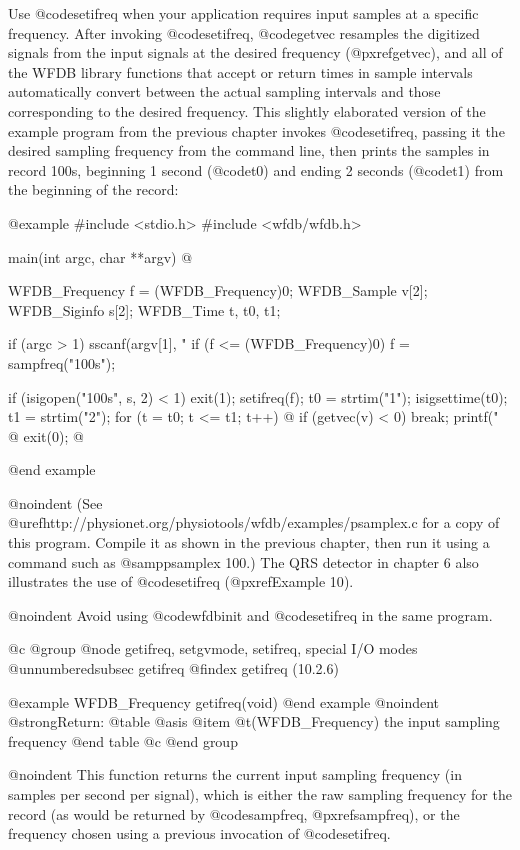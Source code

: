{{{{{{{{Use @code{setifreq} when your application requires input samples at a
specific frequency.  After invoking @code{setifreq}, @code{getvec}
resamples the digitized signals from the input signals at the desired
frequency (@pxref{getvec}), and all of the WFDB library functions that
accept or return times in sample intervals automatically convert between
the actual sampling intervals and those corresponding to the desired
frequency.  This slightly elaborated version of the example program from
the previous chapter invokes @code{setifreq}, passing it the desired sampling
frequency from the command line, then prints the samples in record 100s,
beginning 1 second (@code{t0}) and ending 2 seconds (@code{t1}) from the
beginning of the record:

@example
#include <stdio.h>
#include <wfdb/wfdb.h>

main(int argc, char **argv)
@{
    WFDB_Frequency f = (WFDB_Frequency)0;
    WFDB_Sample v[2];
    WFDB_Siginfo s[2];
    WFDB_Time t, t0, t1;

    if (argc > 1) sscanf(argv[1], "%
    if (f <= (WFDB_Frequency)0) f = sampfreq("100s");

    if (isigopen("100s", s, 2) < 1)
        exit(1);
    setifreq(f);
    t0 = strtim("1");
    isigsettime(t0);
    t1 = strtim("2");
    for (t = t0; t <= t1; t++) @{
        if (getvec(v) < 0)
            break;
        printf("%
    @}
    exit(0);
@}
@end example

@noindent
(See @uref{http://physionet.org/physiotools/wfdb/examples/psamplex.c} for a
copy of this program.  Compile it as shown in the previous chapter, then run it
using a command such as @samp{psamplex 100}.)  The QRS detector in chapter 6
also illustrates the use of @code{setifreq} (@pxref{Example 10}).

@noindent
Avoid using @code{wfdbinit} and @code{setifreq} in the same program.

@c @group
@node     getifreq, setgvmode, setifreq, special I/O modes
@unnumberedsubsec getifreq
@findex getifreq (10.2.6)

@example
WFDB_Frequency getifreq(void)
@end example
@noindent
@strong{Return:}
@table @asis
@item @t{(WFDB_Frequency)}
the input sampling frequency
@end table
@c @end group

@noindent
This function returns the current input sampling frequency (in samples
per second per signal), which is either the raw sampling frequency for
the record (as would be returned by @code{sampfreq}, @pxref{sampfreq}),
or the frequency chosen using a previous invocation of @code{setifreq}.

}}}}}}}}
